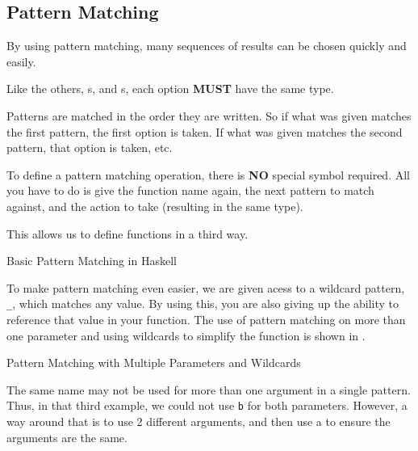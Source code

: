 \subsection{Pattern Matching}\label{subsec:Pattern_Matching}
By using pattern matching, many sequences of results can be chosen quickly and easily.

\begin{blackbox}
  Like the others, s, and s, each option \textbf{MUST} have the same type.
\end{blackbox}

Patterns are matched in the order they are written.
So if what was given matches the first pattern, the first option is taken.
If what was given matches the second pattern, that option is taken, etc.

To define a pattern matching operation, there is \textbf{NO} special symbol required.
All you have to do is give the function name again, the next pattern to match against, and the action to take (resulting in the same type).

This allows us to define functions in a third way.
\begin{listing}[h!tbp]
\caption{Basic Pattern Matching in Haskell}
\label{lst:Pattern_Matching-Single}
\end{listing}

To make pattern matching even easier, we are given acess to a wildcard pattern, \texttt{\_}, which matches any value.
By using this, you are also giving up the ability to reference that value in your function.
The use of pattern matching on more than one parameter and using wildcards to simplify the function is shown in .
\begin{listing}[h!tbp]
\caption{Pattern Matching with Multiple Parameters and Wildcards}
\label{lst:Pattern_Matching-Multiple}
\end{listing}

The same name may not be used for more than one argument in a single pattern.
Thus, in that third example, we could not use \texttt{b} for both parameters.
However, a way around that is to use 2 different arguments, and then use a  to ensure the arguments are the same.

